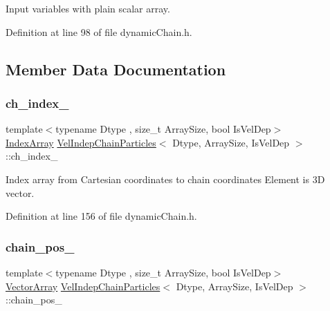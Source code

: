 Input variables with plain scalar array. 



Definition at line 98 of file dynamic\+Chain.\+h.



\subsection{Member Data Documentation}
\mbox{\label{class_vel_indep_chain_particles_a8f10bc65c3e0de542db29178824522cb}} 
\subsubsection{\texorpdfstring{ch\+\_\+index\+\_\+}{ch\_index\_}}
{\footnotesize\ttfamily template$<$typename Dtype , size\+\_\+t Array\+Size, bool Is\+Vel\+Dep$>$ \\
\mbox{\hyperlink{class_vel_indep_chain_particles_a691749351fb710d16619ef6cc43bb1e6}{Index\+Array}} \mbox{\hyperlink{class_vel_indep_chain_particles}{Vel\+Indep\+Chain\+Particles}}$<$ Dtype, Array\+Size, Is\+Vel\+Dep $>$\+::ch\+\_\+index\+\_\+\hspace{0.3cm}{\ttfamily [protected]}}



Index array from Cartesian coordinates to chain coordinates Element is 3D vector. 



Definition at line 156 of file dynamic\+Chain.\+h.

\mbox{\label{class_vel_indep_chain_particles_a8e2defc6dcb9986dbc9c8c62215331aa}} 
\subsubsection{\texorpdfstring{chain\+\_\+pos\+\_\+}{chain\_pos\_}}
{\footnotesize\ttfamily template$<$typename Dtype , size\+\_\+t Array\+Size, bool Is\+Vel\+Dep$>$ \\
\mbox{\hyperlink{class_vel_indep_particles_a27580f65b6523bfb6900520af2e44708}{Vector\+Array}} \mbox{\hyperlink{class_vel_indep_chain_particles}{Vel\+Indep\+Chain\+Particles}}$<$ Dtype, Array\+Size, Is\+Vel\+Dep $>$\+::chain\+\_\+pos\+\_\+\hspace{0.3cm}{\ttfamily [protected]}}



